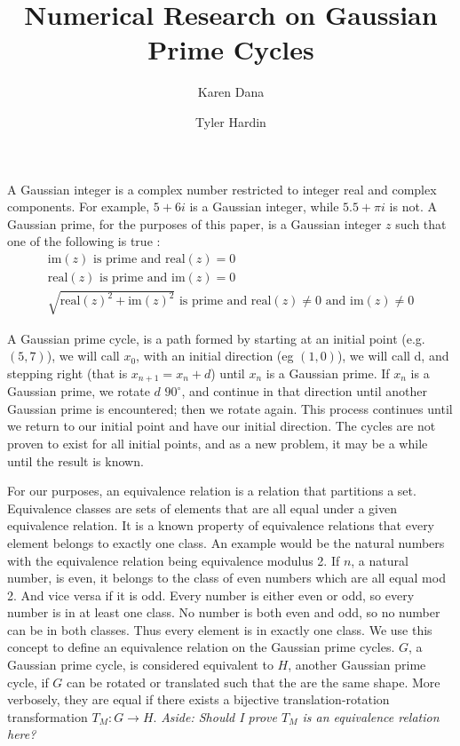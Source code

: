 \documentclass{article}
\title{Numerical Research on Gaussian Prime Cycles}
\author{Karen Dana \and Tyler Hardin}
\begin{document}
	\maketitle
	
A Gaussian integer is a complex number restricted to integer real and complex components. For example, $5+6i$ is a Gaussian integer, while $5.5+\pi i$ is not. A Gaussian prime, for the purposes of this paper, is a Gaussian integer $z$ such that one of the following is true \cite{elem_num_thry}:
\begin{gather*}
  \mbox{im}(z) \mbox{ is prime and } \mbox{real}(z) = 0 \\
  \mbox{real}(z) \mbox{ is prime and } \mbox{im}(z) = 0 \\
  \sqrt{\mbox{real}(z)^2 + \mbox{im}(z)^2} \mbox{ is prime and } \mbox{real}(z) \neq 0 \mbox{ and } \mbox{im}(z) \neq 0
\end{gather*}
  
A Gaussian prime cycle, is a path formed by starting at an initial point (e.g. $(5,7)$), we will call $x_0$, with an initial direction (eg $(1,0)$), we will call d, and stepping right (that is $x_{n+1}=x_n + d$) until $x_n$ is a Gaussian prime. If $x_n$ is a Gaussian prime, we rotate $d$ $90^{\circ}$, and continue in that direction until another Gaussian prime is encountered; then we rotate again. This process continues until we return to our initial point and have our initial direction. The cycles are not proven to exist for all initial points, and as a new problem, it may be a while until the result is known. \cite{mathoverflow,wolfram}

For our purposes, an equivalence relation is a relation that partitions a set. 
Equivalence classes are sets of elements that are all equal under a given equivalence relation. It is a known property of equivalence relations that every element belongs to exactly one class.
An example would be the natural numbers with the equivalence relation being equivalence modulus 2.
If $n$, a natural number, is even, it belongs to the class of even numbers which are all equal mod 2.
And vice versa if it is odd. Every number is either even or odd, so every number is in at least one class. No number is both even and odd, so no number can be in both classes. Thus every element is in exactly one class.
We use this concept to define an equivalence relation on the Gaussian prime cycles.
$G$, a Gaussian prime cycle, is considered equivalent to $H$, another Gaussian prime cycle, if $G$ can be rotated or translated such that the are the same shape.
More verbosely, they are equal if there exists a bijective translation-rotation transformation $T_M:G \to H$. \textit{Aside: Should I prove $T_M$ is an equivalence relation here?}
\end{document}
